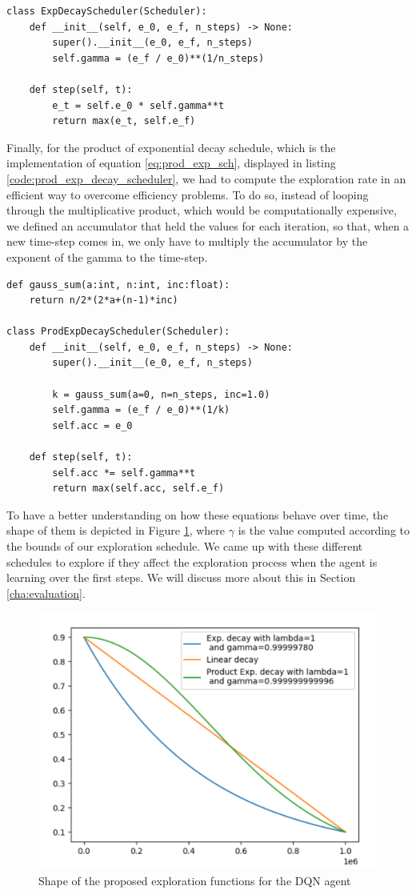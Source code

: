 \begin{lstlisting}[caption={Exponential scheduler class}, label={code:exp_decay_scheduler}]
class ExpDecayScheduler(Scheduler):
	def __init__(self, e_0, e_f, n_steps) -> None:
		super().__init__(e_0, e_f, n_steps)
		self.gamma = (e_f / e_0)**(1/n_steps)
	
	def step(self, t):
		e_t = self.e_0 * self.gamma**t
		return max(e_t, self.e_f)
\end{lstlisting}

Finally, for the product of exponential decay schedule, which is the implementation of equation \ref{eq:prod_exp_sch}, displayed in listing \ref{code:prod_exp_decay_scheduler}, we had to compute the exploration rate in an efficient way to overcome efficiency problems. To do so, instead of looping through the multiplicative product, which would be computationally expensive, we defined an accumulator that held the values for each iteration, so that, when a new time-step comes in, we only have to multiply the accumulator by the exponent of the gamma to the time-step.

\begin{lstlisting}[caption={Product of exponentials decay schedule}, label={code:prod_exp_decay_scheduler}]
def gauss_sum(a:int, n:int, inc:float):
	return n/2*(2*a+(n-1)*inc)
	
class ProdExpDecayScheduler(Scheduler):
	def __init__(self, e_0, e_f, n_steps) -> None:
		super().__init__(e_0, e_f, n_steps)
	
		k = gauss_sum(a=0, n=n_steps, inc=1.0)
		self.gamma = (e_f / e_0)**(1/k)
		self.acc = e_0
	
	def step(self, t):
		self.acc *= self.gamma**t
		return max(self.acc, self.e_f)
\end{lstlisting}

To have a better understanding on how these equations behave over time, the shape of them is depicted in Figure \ref{fig:shape_exp_funs}, where $\gamma$ is the value computed according to the bounds of our exploration schedule. We came up with these different schedules to explore if they affect the exploration process when the agent is learning over the first steps. We will discuss more about this in Section \ref{cha:evaluation}.

\begin{figure}[!h]
	\centering
	\includegraphics[width=0.7\linewidth]{figures/shape_exploration_functions}
	\caption{Shape of the proposed exploration functions for the DQN agent}
	\label{fig:shape_exp_funs}
\end{figure}


